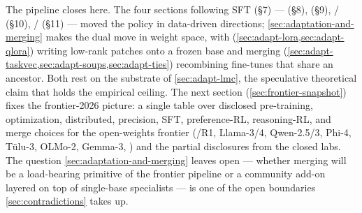 The pipeline closes here. The four sections following SFT (\S7) ---
 (\S8),  (\S9), / (\S10), / (\S11) --- moved the
policy in data-driven directions; \cref{sec:adaptation-and-merging}
makes the dual move in weight space, with 
(\cref{sec:adapt-lora,sec:adapt-qlora}) writing low-rank patches onto a
frozen base and merging
(\cref{sec:adapt-taskvec,sec:adapt-soups,sec:adapt-ties}) recombining
fine-tunes that share an ancestor. Both rest on the  substrate of
\cref{sec:adapt-lmc}, the speculative theoretical claim that holds the
empirical ceiling. The next section
(\cref{sec:frontier-snapshot}) fixes
the frontier-2026 picture: a single table over disclosed pre-training,
optimization, distributed, precision, SFT, preference-RL,
reasoning-RL, and merge choices for the open-weights frontier
(/R1, Llama-3/4, Qwen-2.5/3, Phi-4, Tülu-3, OLMo-2, Gemma-3,
) and the partial disclosures from the closed labs. The
question \cref{sec:adaptation-and-merging} leaves open --- whether
merging will be a load-bearing primitive of the frontier pipeline or
a community add-on layered on top of single-base specialists --- is one
of the open boundaries \cref{sec:contradictions}
takes up.
